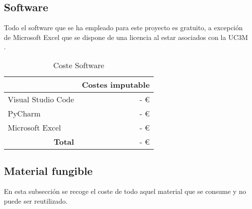 \subsection{Software}
Todo el software que se ha empleado para este proyecto es gratuito, a excepción de Microsoft Excel que se dispone de una licencia al estar asociados con la UC3M \cite{microsoft_microsoft_nodate}.

\begin{table}[H]
	\centering
	\caption{Coste Software}
	\label{tab:coste_software}
	\begin{tabular}{l|r|}
		\hline
		\rowcolor[HTML]{BFBFBF}
		\multicolumn{1}{|c|}{\cellcolor[HTML]{BFBFBF}\textbf{Descripción}} & \multicolumn{1}{c|}{\cellcolor[HTML]{BFBFBF}\textbf{Costes imputable}} \\ \hline
		\multicolumn{1}{|l|}{Visual Studio Code}                           & -   €                                                                  \\ \hline
		\multicolumn{1}{|l|}{PyCharm}                                      & -   €                                                                  \\ \hline
		\multicolumn{1}{|l|}{Microsoft Excel}                              & -   €                                                                  \\ \hline
		\multicolumn{1}{r|}{\textbf{Total}}                                & -   €                                                                  \\ \cline{2-2}
	\end{tabular}
\end{table}

\subsection{Material fungible}
En esta subsección se recoge el coste de todo aquel material que se consume y no puede ser reutilizado.

